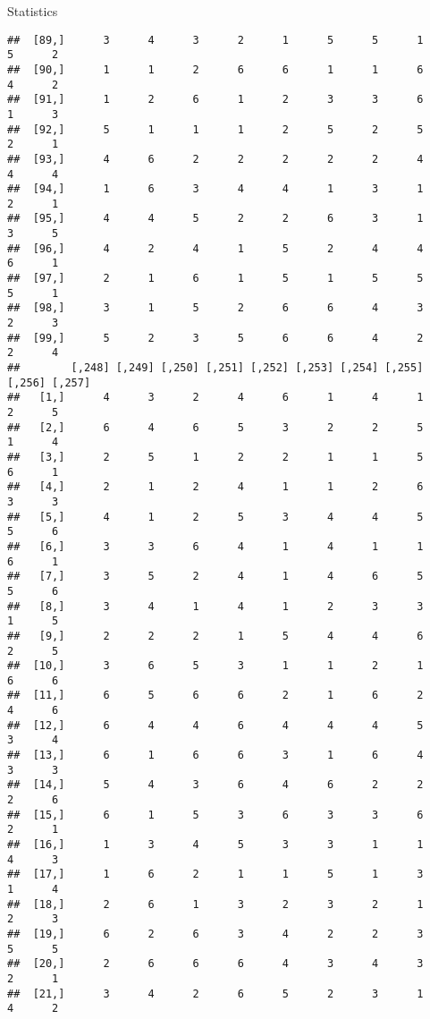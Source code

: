 \documentclass[
  ignorenonframetext,
]{beamer}
\begin{document}
\begin{frame}[fragile]{Statistics}
\begin{verbatim}
##  [89,]      3      4      3      2      1      5      5      1      5      2
##  [90,]      1      1      2      6      6      1      1      6      4      2
##  [91,]      1      2      6      1      2      3      3      6      1      3
##  [92,]      5      1      1      1      2      5      2      5      2      1
##  [93,]      4      6      2      2      2      2      2      4      4      4
##  [94,]      1      6      3      4      4      1      3      1      2      1
##  [95,]      4      4      5      2      2      6      3      1      3      5
##  [96,]      4      2      4      1      5      2      4      4      6      1
##  [97,]      2      1      6      1      5      1      5      5      5      1
##  [98,]      3      1      5      2      6      6      4      3      2      3
##  [99,]      5      2      3      5      6      6      4      2      2      4
##        [,248] [,249] [,250] [,251] [,252] [,253] [,254] [,255] [,256] [,257]
##   [1,]      4      3      2      4      6      1      4      1      2      5
##   [2,]      6      4      6      5      3      2      2      5      1      4
##   [3,]      2      5      1      2      2      1      1      5      6      1
##   [4,]      2      1      2      4      1      1      2      6      3      3
##   [5,]      4      1      2      5      3      4      4      5      5      6
##   [6,]      3      3      6      4      1      4      1      1      6      1
##   [7,]      3      5      2      4      1      4      6      5      5      6
##   [8,]      3      4      1      4      1      2      3      3      1      5
##   [9,]      2      2      2      1      5      4      4      6      2      5
##  [10,]      3      6      5      3      1      1      2      1      6      6
##  [11,]      6      5      6      6      2      1      6      2      4      6
##  [12,]      6      4      4      6      4      4      4      5      3      4
##  [13,]      6      1      6      6      3      1      6      4      3      3
##  [14,]      5      4      3      6      4      6      2      2      2      6
##  [15,]      6      1      5      3      6      3      3      6      2      1
##  [16,]      1      3      4      5      3      3      1      1      4      3
##  [17,]      1      6      2      1      1      5      1      3      1      4
##  [18,]      2      6      1      3      2      3      2      1      2      3
##  [19,]      6      2      6      3      4      2      2      3      5      5
##  [20,]      2      6      6      6      4      3      4      3      2      1
##  [21,]      3      4      2      6      5      2      3      1      4      2

\end{verbatim}
\end{frame}
\end{document}
